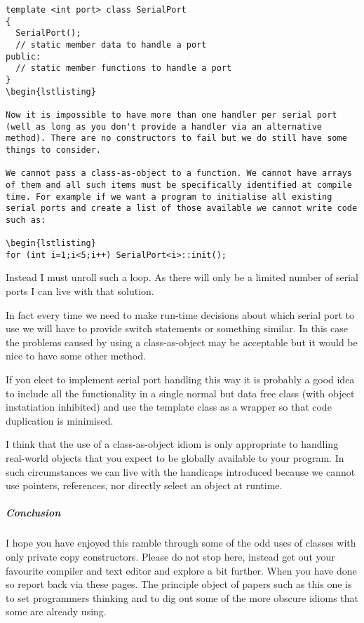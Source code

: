 \documentclass{book}
\begin{document}
\begin{lstlisting}
template <int port> class SerialPort
{
  SerialPort();
  // static member data to handle a port 
public:
  // static member functions to handle a port 
}
\begin{lstlisting}

Now it is impossible to have more than one handler per serial port (well as long as you don't provide a handler via an alternative method). There are no constructors to fail but we do still have some things to consider.

We cannot pass a class-as-object to a function. We cannot have arrays of them and all such items must be specifically identified at compile time. For example if we want a program to initialise all existing serial ports and create a list of those available we cannot write code such as:

\begin{lstlisting}
for (int i=1;i<5;i++) SerialPort<i>::init();
\end{lstlisting}

Instead I must unroll such a loop. As there will only be a limited number of serial ports I can live with that solution.

In fact every time we need to make run-time decisions about which serial port to use we will have to provide switch statements or something similar. 
In this case the problems caused by using a class-as-object may be acceptable but it would be nice to have some other method.

If you elect to implement serial port handling this way it is probably a good idea to include all the functionality in a single normal but data free class (with object instatiation inhibited) and use the template class as a wrapper so that code duplication is minimised.

I think that the use of a class-as-object idiom is only appropriate to handling real-world objects that you expect to be globally available to your program.
In such circumstances we can live with the handicaps introduced because we cannot use pointers, references, nor directly select an object at run­time.
\subparagraph{Conclusion}

I hope you have enjoyed this ramble through some of the odd uses of classes with only private copy constructors. 
Please do not stop here, instead get out your favourite compiler and text editor and explore a bit further.
When you have done so report back via these pages. 
The principle object of papers such as this one is to set programmers thinking and to dig out some of the more obscure idioms that some are already using.
\end{document}
